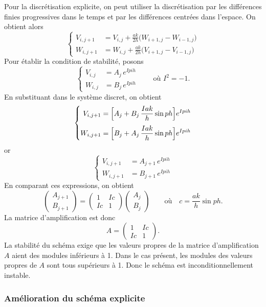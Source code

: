 Pour la discrétisation explicite, on peut utiliser la discrétisation par les
différences finies progressives dans le temps et par les différences centrées
dans l'espace. On obtient alors
\[
  \left\{
  \begin{aligned}
    V_{i,j+1} &= V_{i,j} + \frac{ak}{2h}\bigl(W_{i+1,j} - W_{i-1,j}\bigr)\\[0.3em]
    W_{i,j+1} &= W_{i,j} + \frac{ak}{2h}\bigl(V_{i+1,j} - V_{i-1,j}\bigr)
  \end{aligned}
  \right.
\]
Pour établir la condition de stabilité, posons
\[
  \left\{
  \begin{aligned}
    V_{i,j} &= A_j\,e^{Ipih}\\
    W_{i,j} &= B_j\,e^{Ipih}
  \end{aligned}
  \right.
  \qquad\text{où } I^2 = -1 .
\]
En substituant dans le système discret, on obtient
\[
  \left\{
  \begin{aligned}
    V_{i,j+1} &= \Bigl[A_j + B_j\,\frac{Iak}{h}\sin ph\Bigr]e^{Ipih}\\[0.3em]
    W_{i,j+1} &= \Bigl[B_j + A_j\,\frac{Iak}{h}\sin ph\Bigr]e^{Ipih}
  \end{aligned}
  \right.
\]
or
\[
  \left\{
  \begin{aligned}
    V_{i,j+1} &= A_{j+1}\,e^{Ipih}\\
    W_{i,j+1} &= B_{j+1}\,e^{Ipih}
  \end{aligned}
  \right.
\]
En comparant ces expressions, on obtient
\[
  \begin{pmatrix} A_{j+1}\\ B_{j+1} \end{pmatrix}
  = \begin{pmatrix} 1 & Ic\\ Ic & 1 \end{pmatrix}
    \begin{pmatrix} A_{j}\\ B_{j} \end{pmatrix}
  \qquad\text{où}\quad c = \frac{ak}{h}\sin ph .
\]
La matrice d'amplification est donc
\[
  A = \begin{pmatrix} 1 & Ic\\ Ic & 1 \end{pmatrix}.
\]
La stabilité du schéma exige que les valeurs propres de la matrice
d'amplification $A$ aient des modules inférieurs à 1. Dans le cas présent, les
modules des valeurs propres de $A$ sont tous supérieurs à 1. Donc le schéma
est inconditionnellement instable.

\subsubsection{Amélioration du schéma explicite}

